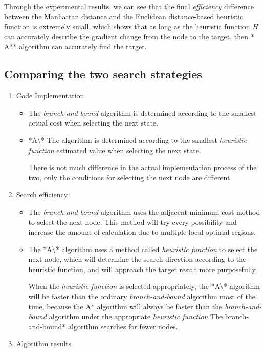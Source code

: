 \documentclass[
]{article}
\begin{document}
Through the experimental results, we can see that the final
\emph{efficiency} difference between the Manhattan distance and the
Euclidean distance-based heuristic function is extremely small, which
shows that as long as the heuristic function \(H\) can accurately
describe the gradient change from the node to the target, then * A**
algorithm can accurately find the target.

\hypertarget{header-n143}{%
\subsection{Comparing the two search strategies}\label{header-n143}}

\begin{enumerate}
\def\labelenumi{\arabic{enumi}.}
\item
  Code Implementation

  \begin{itemize}
  \item
    The \emph{branch-and-bound} algorithm is determined according to the
    smallest actual cost when selecting the next state.
  \item
    *A\textbackslash** The algorithm is determined according to the
    smallest \emph{heuristic function} estimated value when selecting
    the next state.

    There is not much difference in the actual implementation process of
    the two, only the conditions for selecting the next node are
    different.
  \end{itemize}
\item
  Search efficiency

  \begin{itemize}
  \item
    The \emph{branch-and-bound} algorithm uses the adjacent minimum cost
    method to select the next node. This method will try every
    possibility and increase the amount of calculation due to multiple
    local optimal regions.
  \item
    The *A\textbackslash** algorithm uses a method called
    \emph{heuristic function} to select the next node, which will
    determine the search direction according to the heuristic function,
    and will approach the target result more purposefully.

    When the \emph{heuristic function} is selected appropriately, the
    *A\textbackslash** algorithm will be faster than the ordinary
    \emph{branch-and-bound} algorithm most of the time, because the A*
    algorithm will always be faster than the \emph{branch-and-bound}
    algorithm under the appropriate \emph{heuristic function} The
    branch-and-bound* algorithm searches for fewer nodes.
  \end{itemize}
\item
  Algorithm results


\end{enumerate}
\end{document}
